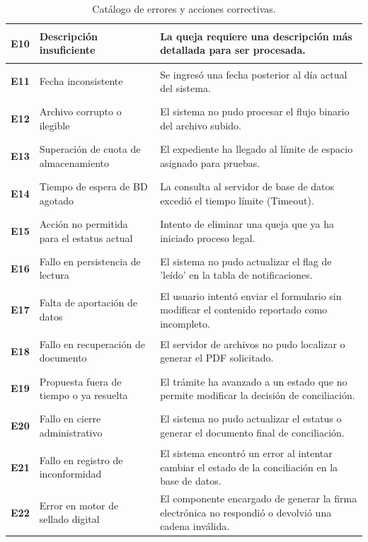 \begin{table}[htbp]
\begin{tabular}{|p{2cm}|p{6cm}|p{6cm}|}
\hypertarget{err:E10}{\textbf{E10}} & Descripción insuficiente & La queja requiere una descripción más detallada para ser procesada. \\ \hline
\hypertarget{err:E11}{\textbf{E11}} & Fecha inconsistente & Se ingresó una fecha posterior al día actual del sistema. \\ \hline
\hypertarget{err:E12}{\textbf{E12}} & Archivo corrupto o ilegible & El sistema no pudo procesar el flujo binario del archivo subido. \\ \hline
\hypertarget{err:E13}{\textbf{E13}} & Superación de cuota de almacenamiento & El expediente ha llegado al límite de espacio asignado para pruebas. \\ \hline
\hypertarget{err:E14}{\textbf{E14}} & Tiempo de espera de BD agotado & La consulta al servidor de base de datos excedió el tiempo límite (Timeout). \\ \hline
\hypertarget{err:E15}{\textbf{E15}} & Acción no permitida para el estatus actual & Intento de eliminar una queja que ya ha iniciado proceso legal. \\ \hline
\hypertarget{err:E16}{\textbf{E16}} & Fallo en persistencia de lectura & El sistema no pudo actualizar el flag de 'leído' en la tabla de notificaciones. \\ \hline
\hypertarget{err:E17}{\textbf{E17}} & Falta de aportación de datos & El usuario intentó enviar el formulario sin modificar el contenido reportado como incompleto. \\ \hline
\hypertarget{err:E18}{\textbf{E18}} & Fallo en recuperación de documento & El servidor de archivos no pudo localizar o generar el PDF solicitado. \\ \hline
\hypertarget{err:E19}{\textbf{E19}} & Propuesta fuera de tiempo o ya resuelta & El trámite ha avanzado a un estado que no permite modificar la decisión de conciliación. \\ \hline
\hypertarget{err:E20}{\textbf{E20}} & Fallo en cierre administrativo & El sistema no pudo actualizar el estatus o generar el documento final de conciliación. \\ \hline
\hypertarget{err:E21}{\textbf{E21}} & Fallo en registro de inconformidad & El sistema encontró un error al intentar cambiar el estado de la conciliación en la base de datos. \\ \hline
\hypertarget{err:E22}{\textbf{E22}} & Error en motor de sellado digital & El componente encargado de generar la firma electrónica no respondió o devolvió una cadena inválida. \\ \hline




\end{tabular}
\caption{Catálogo de errores y acciones correctivas.}
\end{table}